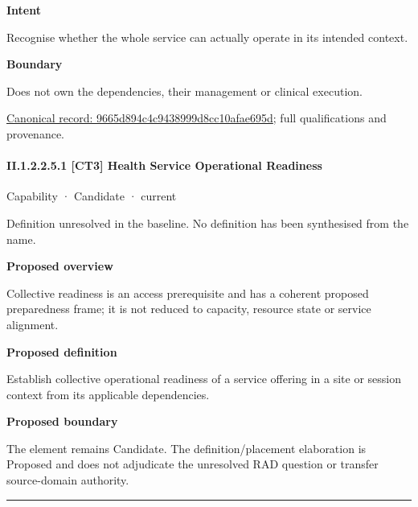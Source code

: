 \textbf{Intent}



Recognise whether the whole service can actually operate in its intended context.



\textbf{Boundary}



Does not own the dependencies, their management or clinical execution.


{\footnotesize \href{../../../../continuum/strategy/capability/9665d894c4c9438999d8cc10afae695d.md}{Canonical record: 9665d894c4c9438999d8cc10afae695d}; full qualifications and provenance.}\par
\paragraph*{II.1.2.2.5.1 [CT3] Health Service Operational Readiness}
\label{navigation:II.1.2.2.5.1}

\label{element:cc91eb4017034939ab82b152bddf7b1c}
{\small Capability · Candidate · current}\par

Definition unresolved in the baseline. No definition has been synthesised from the name.



\textbf{Proposed overview}



Collective readiness is an access prerequisite and has a coherent proposed preparedness frame; it is not reduced to capacity, resource state or service alignment.



\textbf{Proposed definition}



Establish collective operational readiness of a service offering in a site or session context from its applicable dependencies.



\textbf{Proposed boundary}



The element remains Candidate. The definition/placement elaboration is Proposed and does not adjudicate the unresolved RAD question or transfer source-domain authority.



\medskip\hrule\medskip

